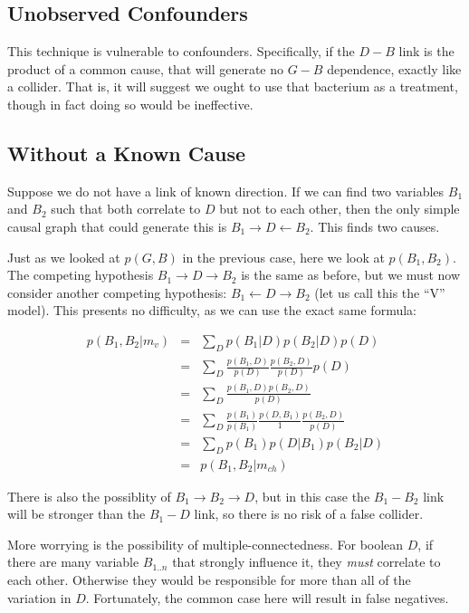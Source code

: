 \documentclass[letterpaper]{article}
\begin{document}
\subsection{Unobserved Confounders}

This technique is vulnerable to confounders.  Specifically, if the
$D-B$ link is the product of a common cause, that will generate no
$G-B$ dependence, exactly like a collider.  That is, it will suggest
we ought to use that bacterium as a treatment, though in fact doing so
would be ineffective.

\subsection{Without a Known Cause}

Suppose we do not have a link of known direction.  If we can find two
variables $B_1$ and $B_2$ such that both correlate to $D$ but not to
each other, then the only simple causal graph that could generate this
is $B_1 \rightarrow D \leftarrow B_2$.  This finds two causes.

Just as we looked at $p(G,B)$ in the previous case, here we look at
$p(B_1,B_2)$.  The competing hypothesis $B_1 \rightarrow D \rightarrow
B_2$ is the same as before, but we must now consider another competing
hypothesis: $B_1 \leftarrow D \rightarrow B_2$ (let us call this the
``V'' model).  This presents no difficulty, as we can use the exact
same formula:

\begin{eqnarray*}
  p(B_1,B_2|m_v)
  & = & \sum_D p(B_1|D)p(B_2|D)p(D) \\
  & = & \sum_D \frac{p(B_1,D)}{p(D)}\frac{p(B_2,D)}{p(D)}p(D) \\
  & = & \sum_D \frac{p(B_1,D)p(B_2,D)}{p(D)} \\
  & = & \sum_D \frac{p(B_1)}{p(B_1)}\frac{p(D,B_1)}{1}\frac{p(B_2,D)}{p(D)} \\
  & = & \sum_D p(B_1)p(D|B_1)p(B_2|D) \\
  & = & p(B_1,B_2|m_{ch})
\end{eqnarray*}

There is also the possiblity of $B_1\rightarrow B_2 \rightarrow D$,
but in this case the $B_1-B_2$ link will be stronger than the $B_1-D$
link, so there is no risk of a false collider.

More worrying is the possibility of multiple-connectedness.  For
boolean $D$, if there are many variable $B_{1..n}$ that strongly
influence it, they \textit{must} correlate to each other.  Otherwise
they would be responsible for more than all of the variation in $D$.
Fortunately, the common case here will result in false negatives.
\end{document}
